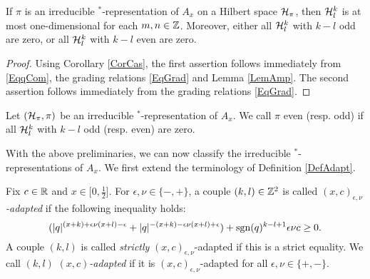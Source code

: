 \begin{Cor}\label{CorOneDim} If $\pi$ is an irreducible $^*$-representation of $A_x$ on a Hilbert space $\mathcal{H}_{\pi}$, then $\mathcal{H}^k_l$ is at most one-dimensional for each $m,n\in \mathbb{Z}$. Moreover, either all $\mathcal{H}^k_l$ with $k-l$ odd are zero, or all $\mathcal{H}^k_l$ with $k-l$ even are zero. 
\end{Cor} 
\begin{proof} 
Using Corollary \ref{CorCas}, the first assertion follows immediately from \eqref{EqqCom}, the grading relations \eqref{EqGrad} and Lemma \ref{LemAmp}. The second assertion follows immediately from the grading relations \eqref{EqGrad}.
\end{proof}

\begin{Def} Let $(\mathcal{H}_{\pi},\pi)$ be an irreducible $^*$-representation of $A_x$. We call $\pi$ even (resp. odd) if all $\mathcal{H}^k_l$ with $k-l$ odd (resp. even) are zero.
\end{Def} 


With the above preliminaries, we can now classify the irreducible $^*$-representations of $A_x$. We first extend the terminology of Definition \ref{DefAdapt}.


\begin{Def} Fix $c\in \mathbb{R}$ and $x\in \lbrack 0,\frac{1}{2}\rbrack$. For $\epsilon,\nu\in \{-,+\}$, a couple $(k,l)\in \mathbb{Z}^2$ is called \emph{$(x,c)_{\epsilon,\nu}$-adapted} if the following inequality holds: \begin{equation}\label{EqAd}(|q|^{(x+k)+\epsilon\nu(x+l)-\epsilon}+|q|^{-(x+k)-\epsilon\nu(x+l)+\epsilon})+\operatorname{\mathrm{sgn}}(q)^{k-l+1}\epsilon\nu c\geq 0.\end{equation} A couple $(k,l)$ is called \emph{strictly} $(x,c)_{\epsilon,\nu}$-adapted if this is a strict equality. We call $(k,l)$ \emph{$(x,c)$-adapted} if it is $(x,c)_{\epsilon,\nu}$-adapted for all $\epsilon,\nu\in \{+,-\}$. 
\end{Def} 

